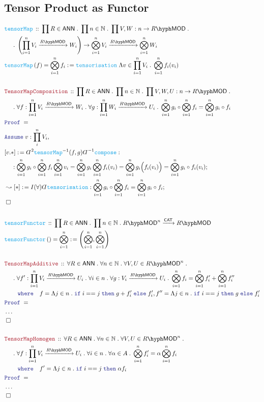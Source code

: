 \documentclass[12pt]{scrartcl}%
\newcommand{\FUNC}[1]{\textcolor{Cerulean}{\mathtt{#1}}}%
\newcommand{\LOGIC}[1]{\textcolor{Blue}{\mathtt{#1}}}%
\newcommand{\THM}[1]{\textcolor{Maroon}{\mathtt{#1}}}%
\renewcommand{\.}{\; . \;} %
\newcommand{\de}{: \kern 0.1pc =} %
\newcommand{\where}{\LOGIC{where}} %
\newcommand{\If}{\LOGIC{if} \;} %
\newcommand{\Then}{ \; \LOGIC{then} \;} %
\newcommand{\Else}{\; \LOGIC{else} \;} %
\newcommand{\Act}[1]{\left( #1 \right)} %
\newcommand{\Theorem}[2]{& \THM{#1} \, :: \, #2 \\ & \Proof = \\ } %
\newcommand{\DeclareFunc}[2]{& \FUNC{#1} \, :: \, #2 \\}%
\newcommand{\DefineNamedFunc}[4]{&  \FUNC{#1}\Act{#2} = #3 \de #4 \\}%
\newcommand{\NewLine}{\\ & \kern 1pc}%
\newcommand{\Page}[1]{ \begin{align*} #1 \end{align*}  }%
\newcommand{ \bd }{ \ByDef }%
\newcommand{\NoProof}{ & \ldots \\ \EndProof}%
\newcommand{\Nat}{\mathbb{N}}%
\newcommand{\Conclude}[3]{& #1 \de #2 : #3; \\}%
\newcommand{\DeriveConclude}[3]{& \leadsto #1 \de #2 : #3 ; \\} %
\newcommand{\Assume}[2]{& \LOGIC{Assume} \; #1 : #2, \\} %
\newcommand{\QED}{\; \square} %
\newcommand{\EndProof}{& \QED \\} %
\newcommand{\ByDef}{\rotatebox[origin=c]{-180}{$D$}}%
\newcommand{\Proof}{\LOGIC{Proof} \; } %
\newcommand{\Arrow}[1]{\xrightarrow{#1}}%
\newcommand{\CAT}{\mathsf{CAT}} %
\newcommand{\LMOD}[1]{#1\hyph\mathsf{MOD}} %
\newcommand{\ANN}{\mathsf{ANN}} %
\begin{document}
\subsection{Tensor Product as Functor}
\Page{
	\DeclareFunc{tensorMap}{
			\prod R \in \ANN \. 
			\prod n \in \Nat \. 
			\prod V,W : n \to \LMOD{R} \. \NewLine \. 
			\left( \prod^n_{i=1} V_i \Arrow{\LMOD{R}} W_i\right) \to 
			\bigotimes^n_{i=1} V_i \Arrow{\LMOD{R}}  \bigotimes^n_{i=1} W_i
		}
	\DefineNamedFunc{tensorMap}{f}{\bigotimes^n_{i=1} f_i}{\FUNC{tensorisation} \; \Lambda v \in \prod^n_{i=1} V_i \. \bigotimes^n_{i=1} f_i(v_i)}
	\\
	\Theorem{TensorMapComposition}{
		\prod R \in \ANN \. 
		\prod n \in \Nat \.
		\prod V,W,U : n \to \LMOD{R} \. \NewLine \.
		\forall f : \prod^n_{i=1} V_i \Arrow{\LMOD{R}} W_i \.
		\forall g : \prod^n_{i=1} W_i \Arrow{\LMOD{R}} U_i \.
		\bigotimes^n_{i=1} g_i \circ \bigotimes^n_{i=1} f_i =
		\bigotimes^n_{i=1}  g_i \circ f_i
	}
	\Assume{v}{\prod^n_i V_i}
	\Conclude{[v.*]}{\bd^2 \FUNC{tensorMap}^{-1}(f,g) \bd^{-1} \FUNC{compose}}
	{   	\NewLine :
		\bigotimes^n_{i=1} g_i \circ \bigotimes^n_{i=1} f_i \bigotimes^n_{i=1} v_i = 
		\bigotimes^n_{i=1} g_i \bigotimes^n_{i=1} f_i(v_i) =
		\bigotimes^n_{i=1} g_i\Big(f_i(v_i)\Big) =
		\bigotimes^n_{i=1} g_i \circ f_i(v_i)
	}
	\DeriveConclude{[*]}{I(\forall)\bd \FUNC{tensorisation}}{\bigotimes^n_{i=1} g_i \circ \bigotimes^n_{i=1} f_i = \bigotimes^n_{i=1} g_i \circ f_i}
	\EndProof
	\\
	\DeclareFunc{tensorFunctor}{\prod R \in \ANN \. \prod n \in \Nat \. \LMOD{R}^n \Arrow{\CAT} \LMOD{R}}
	\DefineNamedFunc{tensorFunctor}{}{\bigotimes^n_{i=1}}{\left( \bigotimes^n_{i=1},\bigotimes^n_{i=1} \right)}
	\\
	\Theorem{TensorMapAdditive}{
		\forall R \in \ANN \. \forall n \in \Nat \. \forall V,U \in \LMOD{R}^n \. 
		\NewLine \.
		\forall f' : \prod^n_{i=1} V_i \Arrow{\LMOD{R}} U_i \. 
		\forall i \in n \. \forall g : V_i \Arrow{\LMOD{R}} U_i \. \bigotimes^n_{i=1} f_i = \bigotimes^n_{i=1} f'_i + \bigotimes^n_{i=1} f''_i
		\NewLine
		\quad \where \quad f = \Lambda j \in n \. \If i == j \Then g + f_i' \Else f_i', f'' = \Lambda j \in n \. \If i == j \Then g \Else f'_i
	}
	\NoProof
	\\
	\Theorem{TensorMapHomogen}{
		\forall R \in \ANN \. \forall n \in \Nat \. \forall V,U \in \LMOD{R}^n \. 
		\NewLine \.
		\forall f : \prod^n_{i=1} V_i \Arrow{\LMOD{R}} U_i \. 
		\forall i \in n \. \forall \alpha \in A \. \bigotimes^n_{i=1} f_i' = \alpha \bigotimes^n_{i=1} f_i 
		\NewLine
		\quad \where \quad f' = \Lambda j \in n \. \If i == j \Then \alpha f_i
	}
	\NoProof
}
\end{document}
